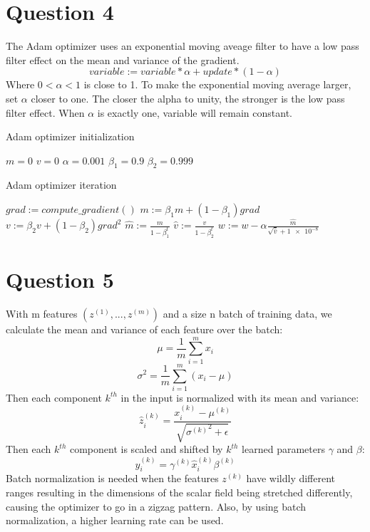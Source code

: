 \documentclass[10pt]{article}
\begin{document}
\section{Question 4}
The Adam optimizer uses an exponential moving aveage filter to have a low pass filter effect on the mean and variance of the gradient.
\[
	variable:=variable*\alpha+update*(1-\alpha)
\]
Where $0<\alpha<1$ is close to 1.
To make the exponential moving average larger, set $\alpha$ closer to one.
The closer the alpha to unity, the stronger is the low pass filter effect.
When $\alpha$ is exactly one, variable will remain constant.

\begin{algorithm}
\caption{Adam optimizer initialization}\label{euclid}
\begin{algorithmic}[1]
\State $m=0$
\State $v=0$
\State $\alpha=0.001$
\State $\beta_1=0.9$
\State $\beta_2=0.999$
\EndProcedure
\end{algorithmic}
\end{algorithm}

\begin{algorithm}
\caption{Adam optimizer iteration}\label{euclid}
\begin{algorithmic}[2]
\State $grad:=compute\_gradient()$
\State $m:=\beta_1 m+(1-\beta_1)grad$
\State $v:=\beta_2 v+(1-\beta_2)grad^2$
\State $\hat{m}:=\frac{m}{1-\beta_1^t}$
\State $\hat{v}:=\frac{v}{1-\beta_2^t}$
\State $w:=w-\alpha\frac{\hat{m}}{\sqrt{\hat{v}}+\num{1e-8}}$
\EndProcedure
\end{algorithmic}
\end{algorithm}

\section{Question 5}
With m features $(z^{(1)}, ..., z^{(m)})$ and a size n batch of training data, we calculate the mean and variance of each feature over the batch:
\[	\mu=\frac{1}{m}\sum_{i=1}^{m}x_i\]
\[	\sigma^2=\frac{1}{m}\sum_{i=1}^{m}(x_i-\mu)\]
Then each component $k^{th}$ in the input is normalized with its mean and variance:
\[	\hat{z}_i^{(k)}=\frac{x_i^{(k)}-\mu^{(k)}}{\sqrt{{\sigma^{(k)}}^2+\epsilon}}\]
Then each $k^{th}$ component is scaled and shifted by $k^{th}$ learned parameters $\gamma$ and $\beta$:
\[	y_i^{(k)}=\gamma^{(k)}\hat{x}_i^{(k)}\beta^{(k)}\]
Batch normalization is needed when the features $z^{(k)}$ have wildly different ranges resulting in the dimensions of the scalar field being stretched differently, causing the optimizer to go in a zigzag pattern. Also, by using batch normalization, a higher learning rate can be used.
\end{document}
